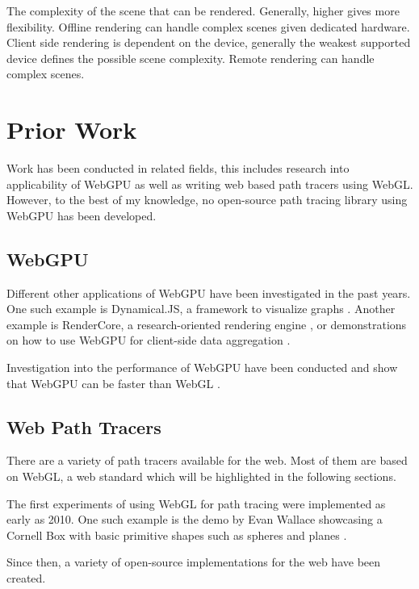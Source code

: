 The complexity of the scene that can be rendered. Generally, higher gives more flexibility. Offline rendering can handle complex scenes given dedicated hardware. Client side rendering is dependent on the device, generally the weakest supported device defines the possible scene complexity. Remote rendering can handle complex scenes.

\section{Prior Work}

Work has been conducted in related fields, this includes research into applicability of WebGPU as well as writing web based path tracers using WebGL. However, to the best of my knowledge, no open-source path tracing library using WebGPU has been developed.

\subsection*{WebGPU}

Different other applications of WebGPU have been investigated in the past years. One such example is Dynamical.JS, a framework to visualize graphs \cite{dotson2022dynamicaljs}. Another example is RenderCore, a research-oriented rendering engine \cite{Bohak_Kovalskyi_Linev_Mrak_Tadel_Strban_Tadel_Yagil_2024}, or demonstrations on how to use WebGPU for client-side data aggregation \cite{kimmersdorfer2023webgpu}.

Investigation into the performance of WebGPU have been conducted and show that WebGPU can be faster than WebGL \cite{webGPUWebGis, fransson2023performance, CHICKERUR2024919}.
 

\subsection*{Web Path Tracers}

There are a variety of path tracers available for the web. Most of them are based on WebGL, a web standard which will be highlighted in the following sections.

The first experiments of using WebGL for path tracing were implemented as early as 2010. One such example is the demo by Evan Wallace showcasing a Cornell Box with basic primitive shapes such as spheres and planes \cite{pathTracerWallace}.

Since then, a variety of open-source implementations for the web have been created.

